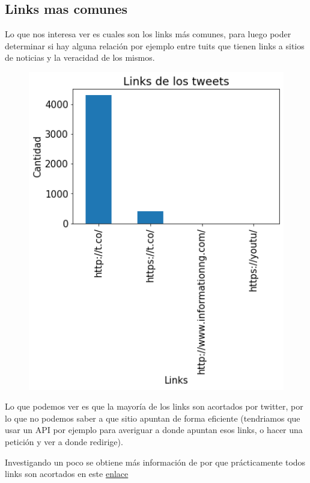 \documentclass[titlepage,a4paper]{article}
\begin{document}
\subsection{\Large Links mas comunes}
{\Large 
Lo que nos interesa ver es cuales son los links más comunes, para luego poder determinar si hay alguna relación por ejemplo entre tuits que tienen links a sitios de noticias y la veracidad de los mismos.\\
\par}
{\Large
\begin{figure}[H]
 \centering
 \includegraphics[width=1\textwidth, height=1\textheight, keepaspectratio]{graficos/frecuencialinks.png}
\end{figure}
Lo que podemos ver es que la mayoría de los links son acortados por twitter, por lo que no podemos saber a que sitio apuntan de forma eficiente (tendriamos que usar un API por ejemplo para averiguar a donde apuntan esos links, o hacer una petición y ver a donde redirige). 

Investigando un poco se obtiene más información de por que prácticamente todos links son acortados en este  \href{https://help.twitter.com/es/using-twitter/url-shortener}{enlace}
\par}
\end{document}
